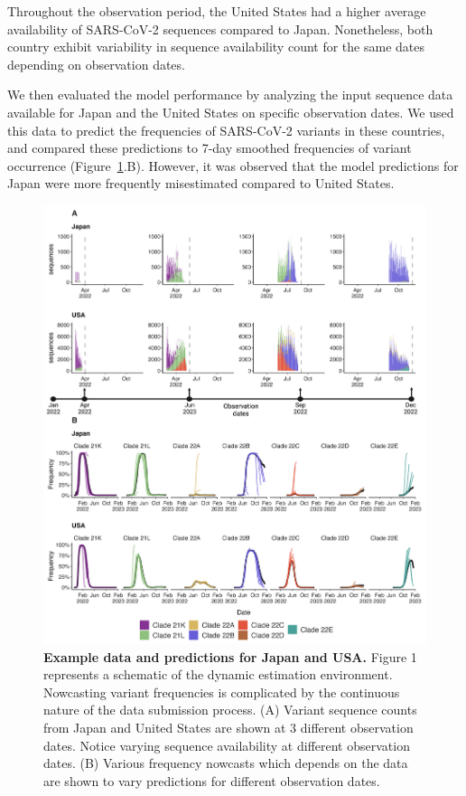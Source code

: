 \documentclass[11pt,oneside,letterpaper]{article}
\begin{document}
Throughout the observation period, the United States had a higher average availability of SARS-CoV-2 sequences compared to Japan. 
Nonetheless, both country exhibit variability in sequence availability count for the same dates depending on observation dates. 


We then evaluated the model performance by analyzing the input sequence data available for Japan and the United States on specific observation dates.
We used this data to predict the frequencies of SARS-CoV-2 variants in these countries, and compared these predictions to 7-day smoothed frequencies of variant occurrence (Figure~\ref{fig:dynamic_forecast_env}.B).
However, it was observed that the model predictions for Japan were more frequently misestimated compared to United States.



\begin{figure}[H]
	\centering
	\includegraphics[width=0.8\textwidth=0.01]{figures/Dynamic_est_env.png}
	\caption{\textbf{Example data and predictions for Japan and USA.}
	Figure 1 represents a schematic of the dynamic estimation environment.
	Nowcasting variant frequencies is complicated by the continuous nature of the data submission process.
	(A) Variant sequence counts from Japan and United States are shown at 3 different observation dates.
	Notice varying sequence availability at different observation dates. 
	(B) Various frequency nowcasts which depends on the data are shown to vary predictions for different observation dates. 
	}
	\label{fig:dynamic_forecast_env}
\end{figure}
\end{document}
